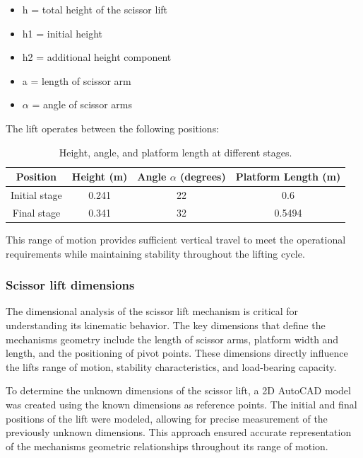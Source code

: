 \documentclass[../../main]{subfiles}
\begin{document}
\begin{itemize}
\item
  h = total height of the scissor lift
\item
  h1 = initial height
\item
  h2 = additional height component
\item
  a = length of scissor arm
\item
  $\alpha$ = angle of scissor arms
\end{itemize}

The lift operates between the following positions:

\begin{table}[h!]
  \centering
  \begin{tcolorbox}[
    colback=red!5!white,colframe=red!75!black,
    title={\textbf{ Height \& angle}},
    fonttitle=\bfseries, coltitle=white, width=0.859\linewidth]
  \begin{tabular}{|c|c|c|c|}
      \hline \rowcolor{red!20}
      Position & Height (m) & Angle $\alpha$ (degrees) & Platform Length (m) \\ \hline
      Initial stage & 0.241 & 22 & 0.6 \\ \hline
      Final stage & 0.341 & 32 & 0.5494 \\ \hline
  \end{tabular}
\end{tcolorbox}
\caption{Height, angle, and platform length at different stages.}
\end{table}

This range of motion provides sufficient vertical travel to meet the
operational requirements while maintaining stability throughout the
lifting cycle.

\subsubsection{Scissor lift dimensions}

The dimensional analysis of the scissor lift mechanism is critical for
understanding its kinematic behavior. The key dimensions that define the
mechanism\textquotesingle s geometry include the length of scissor arms,
platform width and length, and the positioning of pivot points. These
dimensions directly influence the lift\textquotesingle s range of
motion, stability characteristics, and load-bearing capacity.

To determine the unknown dimensions of the scissor lift, a 2D AutoCAD
model was created using the known dimensions as reference points. The
initial and final positions of the lift were modeled, allowing for
precise measurement of the previously unknown dimensions. This approach
ensured accurate representation of the mechanism\textquotesingle s
geometric relationships throughout its range of motion.
\end{document}

